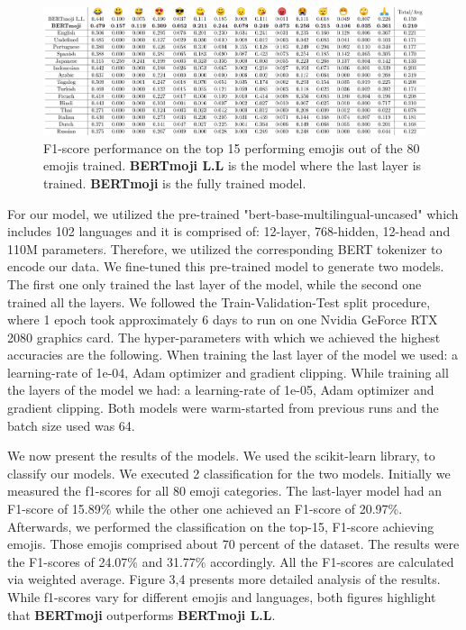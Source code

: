 \documentclass[11pt]{article}
\begin{document}
\begin{figure}[ht]
    \centering
    \includegraphics[width=\textwidth]{images/F1_LANG_EMOJIS.pdf}
    \caption{F1-score performance on the top 15 performing emojis out of the 80 emojis trained. 
    \textbf{BERTmoji L.L} is the model where the last layer is trained. \textbf{BERTmoji} is the fully trained model.}
    \label{fig:tweets_per_day}
\end{figure}

For our model, we utilized the pre-trained "bert-base-multilingual-uncased" which includes 102 languages and it is comprised of: 12-layer, 768-hidden, 12-head and 110M parameters.
Therefore, we utilized the corresponding BERT tokenizer to encode our data.
We fine-tuned this pre-trained model to generate two models. 
The first one only trained the last layer of the model, while the second one trained all the layers.
We followed the Train-Validation-Test split procedure, where 1 epoch took approximately 6 days to run on one Nvidia GeForce RTX 2080 graphics card.
The hyper-parameters with which we achieved the highest accuracies are the following. 
When training the last layer of the model we used: a learning-rate of 1e-04, Adam optimizer and gradient clipping. 
While training all the layers of the model we had: a learning-rate of 1e-05, Adam optimizer and gradient clipping. 
Both models were warm-started from previous runs and the batch size used was 64.

We now present the results of the models. We used the scikit-learn \cite{} library, to classify our models.
We executed 2 classification for the two models. Initially we measured the f1-scores for all 80 emoji categories.
The last-layer model had an F1-score of 15.89\% while the other one achieved an F1-score of 20.97\%. 
Afterwards, we performed the classification on the top-15, F1-score achieving emojis. 
Those emojis comprised about 70 percent of the dataset.
The results were the F1-scores of 24.07\% and 31.77\% accordingly.
All the F1-scores are calculated via weighted average. Figure 3,4 presents more detailed analysis of the results.
While f1-scores vary for different emojis and languages,
both figures highlight that  \textbf{BERTmoji} outperforms \textbf{BERTmoji L.L}. 
\end{document}
